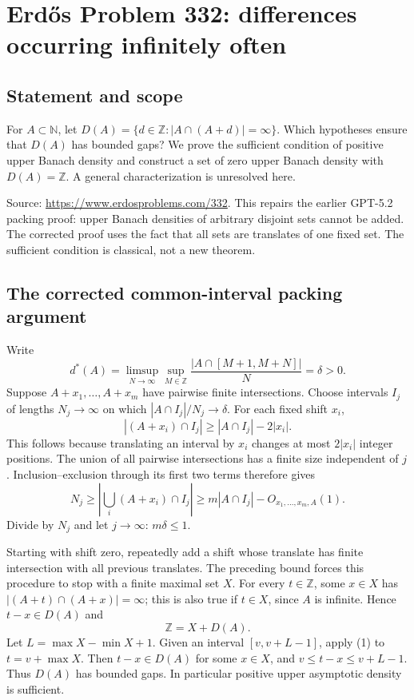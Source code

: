 \section*{Erd\H{o}s Problem 332: differences occurring infinitely often}
\subsection*{Statement and scope}
For $A\subset\mathbb N$, let
$D(A)=\{d\in\mathbb Z:|A\cap(A+d)|=\infty\}$. Which hypotheses ensure that $D(A)$ has bounded gaps? We prove the sufficient condition of positive upper Banach density and construct a set of zero upper Banach density with $D(A)=\mathbb Z$. A general characterization is unresolved here.

Source: \url{https://www.erdosproblems.com/332}. This repairs the earlier GPT-5.2 packing proof: upper Banach densities of arbitrary disjoint sets cannot be added. The corrected proof uses the fact that all sets are translates of one fixed set. The sufficient condition is classical, not a new theorem.

\subsection*{The corrected common-interval packing argument}
Write
\[
 d^*(A)=\limsup_{N\to\infty}\sup_{M\in\mathbb Z}
 \frac{|A\cap[M+1,M+N]|}{N}=\delta>0.
\]
Suppose $A+x_1,\ldots,A+x_m$ have pairwise finite intersections. Choose intervals $I_j$ of lengths $N_j\to\infty$ on which $|A\cap I_j|/N_j\to\delta$. For each fixed shift $x_i$,
\[
 |(A+x_i)\cap I_j|\ge |A\cap I_j|-2|x_i|.
\]
This follows because translating an interval by $x_i$ changes at most $2|x_i|$ integer positions. The union of all pairwise intersections has a finite size independent of $j$. Inclusion--exclusion through its first two terms therefore gives
\[
 N_j\ge\left|\bigcup_i(A+x_i)\cap I_j\right|
 \ge m|A\cap I_j|-O_{x_1,\ldots,x_m,A}(1).
\]
Divide by $N_j$ and let $j\to\infty$: $m\delta\le1$.

Starting with shift zero, repeatedly add a shift whose translate has finite intersection with all previous translates. The preceding bound forces this procedure to stop with a finite maximal set $X$. For every $t\in\mathbb Z$, some $x\in X$ has
$|(A+t)\cap(A+x)|=\infty$; this is also true if $t\in X$, since $A$ is infinite. Hence $t-x\in D(A)$ and
\[
 \mathbb Z=X+D(A). \tag{1}
\]
Let $L=\max X-\min X+1$. Given an interval $[v,v+L-1]$, apply (1) to $t=v+\max X$. Then $t-x\in D(A)$ for some $x\in X$, and
$v\le t-x\le v+L-1$. Thus $D(A)$ has bounded gaps. In particular positive upper asymptotic density is sufficient.

